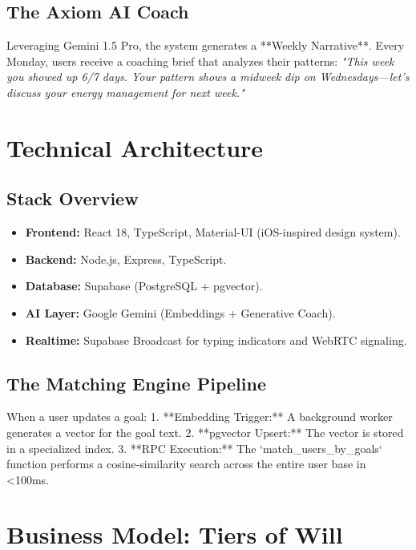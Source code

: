 \documentclass[11pt,a4paper,oneside]{article}
\begin{document}
\subsection{The Axiom AI Coach}
Leveraging Gemini 1.5 Pro, the system generates a **Weekly Narrative**. Every Monday, users receive a coaching brief that analyzes their patterns:
\textit{"This week you showed up 6/7 days. Your pattern shows a midweek dip on Wednesdays—let's discuss your energy management for next week."}

\section{Technical Architecture}

\subsection{Stack Overview}
\begin{itemize}
    \item \textbf{Frontend:} React 18, TypeScript, Material-UI (iOS-inspired design system).
    \item \textbf{Backend:} Node.js, Express, TypeScript.
    \item \textbf{Database:} Supabase (PostgreSQL + pgvector).
    \item \textbf{AI Layer:} Google Gemini (Embeddings + Generative Coach).
    \item \textbf{Realtime:} Supabase Broadcast for typing indicators and WebRTC signaling.
\end{itemize}

\subsection{The Matching Engine Pipeline}
When a user updates a goal:
1. **Embedding Trigger:** A background worker generates a vector for the goal text.
2. **pgvector Upsert:** The vector is stored in a specialized index.
3. **RPC Execution:** The `match_users_by_goals` function performs a cosine-similarity search across the entire user base in <100ms.

\section{Business Model: Tiers of Will}
\end{document}
